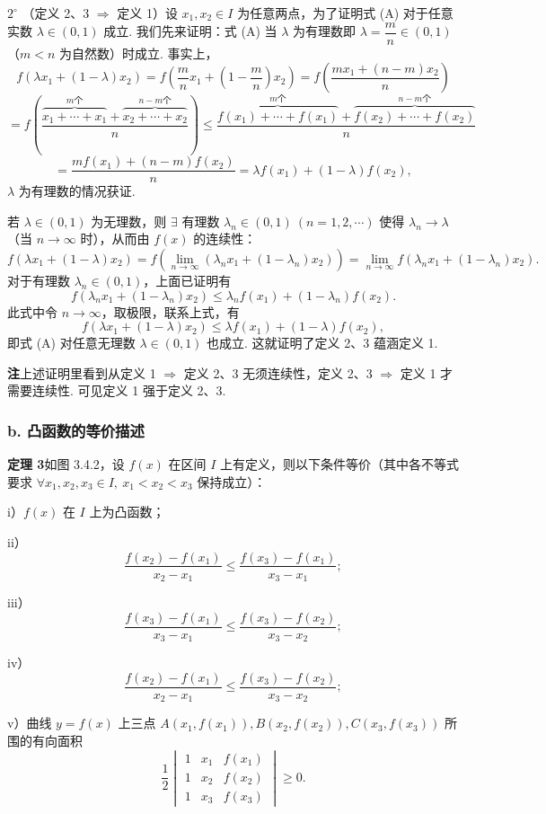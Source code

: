 \documentclass[UTF8,12pt,a4paper,fontset=fandol]{ctexart}
\begin{document}
$2^\circ$ （定义 2、3 $\Rightarrow$ 定义 1）设 $x_1,x_2\in I$ 为任意两点，为了证明式 (A) 对于任意实数 $\lambda\in(0,1)$ 成立. 我们先来证明：式 (A) 当 $\lambda$ 为有理数即 $\lambda=\dfrac mn\in(0,1)$（$m<n$ 为自然数）时成立. 事实上，
\[
  f(\lambda x_1+(1-\lambda)x_2)
  =f\left(\frac mn x_1+\left(1-\frac mn\right)x_2\right)
  =f\left(\frac{mx_1+(n-m)x_2}{n}\right)
\]
\[
  =f\left(\frac{\overbrace{x_1+\cdots+x_1}^{m\text{个}}+\overbrace{x_2+\cdots+x_2}^{n-m\text{个}}}{n}\right)
  \le\frac{\overbrace{f(x_1)+\cdots+f(x_1)}^{m\text{个}}+\overbrace{f(x_2)+\cdots+f(x_2)}^{n-m\text{个}}}{n}
\]
\[
  =\frac{mf(x_1)+(n-m)f(x_2)}{n}
  =\lambda f(x_1)+(1-\lambda)f(x_2),
\]
$\lambda$ 为有理数的情况获证.

若 $\lambda\in(0,1)$ 为无理数，则 $\exists$ 有理数 $\lambda_n\in(0,1)\ (n=1,2,\cdots)$ 使得 $\lambda_n\to\lambda$（当 $n\to\infty$ 时），从而由 $f(x)$ 的连续性：
\[
  f(\lambda x_1+(1-\lambda)x_2)
  =f\left(\lim_{n\to\infty}(\lambda_nx_1+(1-\lambda_n)x_2)\right)
  =\lim_{n\to\infty}f(\lambda_nx_1+(1-\lambda_n)x_2).
\]
对于有理数 $\lambda_n\in(0,1)$，上面已证明有
\[
  f(\lambda_nx_1+(1-\lambda_n)x_2)
  \le \lambda_n f(x_1)+(1-\lambda_n)f(x_2).
\]
此式中令 $n\to\infty$，取极限，联系上式，有
\[
  f(\lambda x_1+(1-\lambda)x_2)
  \le \lambda f(x_1)+(1-\lambda)f(x_2),
\]
即式 (A) 对任意无理数 $\lambda\in(0,1)$ 也成立. 这就证明了定义 2、3 蕴涵定义 1.

\noindent\textbf{注}\quad 上述证明里看到从定义 1 $\Rightarrow$ 定义 2、3 无须连续性，定义 2、3 $\Rightarrow$ 定义 1 才需要连续性. 可见定义 1 强于定义 2、3.

\subsubsection*{b. 凸函数的等价描述}

\noindent\textbf{定理 3}\quad 如图 3.4.2，设 $f(x)$ 在区间 $I$ 上有定义，则以下条件等价（其中各不等式要求 $\forall x_1,x_2,x_3\in I,\ x_1<x_2<x_3$ 保持成立）：

i）$f(x)$ 在 $I$ 上为凸函数；

ii）
\[
  \frac{f(x_2)-f(x_1)}{x_2-x_1}
  \le \frac{f(x_3)-f(x_1)}{x_3-x_1};
\]

iii）
\[
  \frac{f(x_3)-f(x_1)}{x_3-x_1}
  \le \frac{f(x_3)-f(x_2)}{x_3-x_2};
\]

iv）
\[
  \frac{f(x_2)-f(x_1)}{x_2-x_1}
  \le \frac{f(x_3)-f(x_2)}{x_3-x_2};
\]

v）曲线 $y=f(x)$ 上三点 $A(x_1,f(x_1)),B(x_2,f(x_2)),C(x_3,f(x_3))$ 所围的有向面积
\[
  \frac12
  \begin{vmatrix}
  1&x_1&f(x_1)\\
  1&x_2&f(x_2)\\
  1&x_3&f(x_3)
  \end{vmatrix}\ge0.
\]
\end{document}
